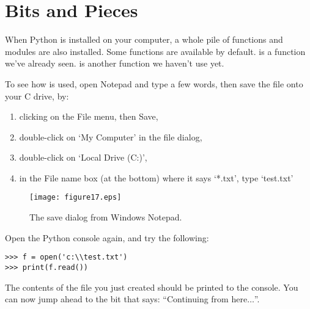 \section{Bits and Pieces}

When Python is installed on your computer, a whole pile of functions and modules are also installed. Some functions are available by default.   is a function we've already seen.  is another function we haven't use yet.

\begin{WINDOWS}

To see how  is used, open Notepad and type a few words, then save the file onto your C drive, by:

\begin{enumerate}
 \item clicking on the File menu, then Save,
 \item double-click on `My Computer' in the file dialog,
 \item double-click on `Local Drive (C:)',
 \item in the File name box (at the bottom) where it says `*.txt', type `test.txt' 
\end{enumerate}

\begin{figure}
\begin{center}
\texttt{[image: figure17.eps]}
\end{center}
\caption{The save dialog from Windows Notepad.}\label{fig17}
\end{figure}

Open the Python console again, and try the following:

\begin{listing}
\begin{verbatim}
>>> f = open('c:\\test.txt')
>>> print(f.read())
\end{verbatim}
\end{listing}

The contents of the file you just created should be printed to the console. You can now jump ahead to the bit that says: ``Continuing from here$\ldots$''.
\end{WINDOWS}


